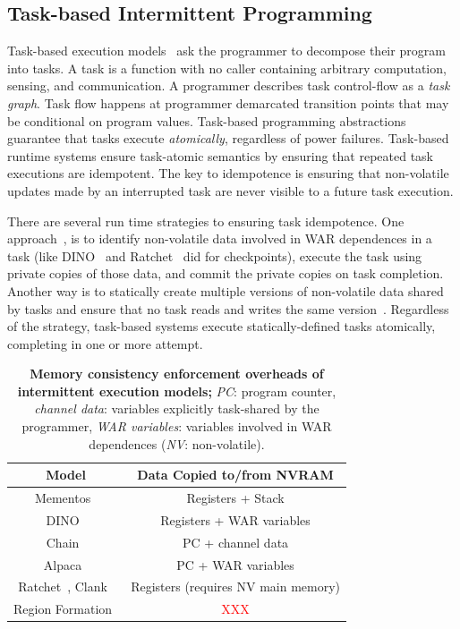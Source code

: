\subsection{Task-based Intermittent Programming}
\label{section:background_task_computing}

Task-based execution models~\cite{dino,chain,alpaca} ask the programmer to decompose their program into tasks. A task is a function with no caller containing arbitrary computation, sensing, and communication. A programmer describes task control-flow as a {\em task graph}. Task flow happens at programmer demarcated transition points that may be conditional on program values. Task-based programming abstractions guarantee that tasks execute {\em atomically}, regardless of power failures. Task-based runtime systems ensure task-atomic semantics by ensuring that repeated task executions are idempotent. The key to idempotence is ensuring that non-volatile updates made by an interrupted task are never visible to a future task execution.  

There are several run time strategies to ensuring task idempotence. One approach~\cite{alpaca}, is to identify non-volatile data involved in WAR dependences in a task (like DINO~\cite{dino} and Ratchet~\cite{ratchet} did for checkpoints), execute the task using private copies of those data, and commit the private copies on task completion. Another way is to statically create multiple versions of non-volatile data shared by tasks and ensure that no task reads and writes the same version~\cite{chain}. Regardless of the strategy, task-based systems execute statically-defined tasks atomically, completing in one or more attempt. 

\begin{table}
	\centering
	\footnotesize
	\begin{tabular}{|c|c|}
		\hline
		Model & Data Copied to/from NVRAM \\
		\hline\hline
		Mementos~\cite{mementos}	& Registers + Stack     \\
		DINO~\cite{dino}	& Registers + WAR variables \\
		Chain~\cite{chain}	& PC + channel data\\
		Alpaca~\cite{alpaca}	& PC + WAR variables \\
		Ratchet~\cite{ratchet}, Clank~\cite{hicks_isca_2017} & Registers (requires NV main memory) \\
		Region Formation~\cite{baghsorkhi_cgo_2018} & \textcolor{red}{XXX} \\
		\hline
	\end{tabular}
	\caption{\textbf{Memory consistency enforcement overheads of intermittent execution models;} \emph{PC}: program counter, \emph{channel data}: variables explicitly task-shared by the programmer, \emph{WAR variables}: variables involved in WAR dependences (\emph{NV}: non-volatile).}
	\label{table:chechpoint_comparison}
\end{table}

